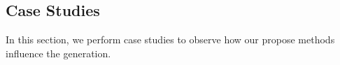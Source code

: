 



\subsection{Case Studies}
\label{sec:cases}
In this section, we perform case studies to observe 
how our propose methods influence the generation.


